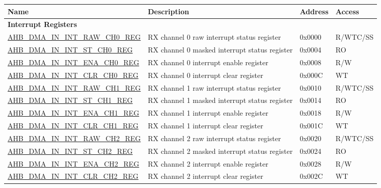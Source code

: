 \newif\ifahbdmalateststatus
\iftagged{ESP32-P4-latest}{\ahbdmalateststatustrue}{\ahbdmalateststatusfalse}
\begin{longtable}{ | l | p{10cm} | p{1.3cm} | l | }
\hline\rowcolor{lightgray}
\textbf{Name} & \textbf{Description} & \textbf{Address} & \textbf{Access} \\ \hline
\endhead
\multicolumn{4}{|l|}{\textbf{Interrupt Registers}} \\ \hline
\hyperref[regdesc:AHBDMAININTRAWCHNREG]{AHB\_DMA\_IN\_INT\_RAW\_CH0\_REG} & RX channel 0 raw interrupt status register & 0x0000 & R/WTC/SS \\ \hline
\hyperref[regdesc:AHBDMAININTSTCHNREG]{AHB\_DMA\_IN\_INT\_ST\_CH0\_REG} & RX channel 0 masked interrupt status register & 0x0004 & RO \\ \hline
\hyperref[regdesc:AHBDMAININTENACHNREG]{AHB\_DMA\_IN\_INT\_ENA\_CH0\_REG} & RX channel 0 interrupt enable register & 0x0008 & R/W \\ \hline
\hyperref[regdesc:AHBDMAININTCLRCHNREG]{AHB\_DMA\_IN\_INT\_CLR\_CH0\_REG} & RX channel 0 interrupt clear register & 0x000C & WT \\ \hline
\hyperref[regdesc:AHBDMAININTRAWCHNREG]{AHB\_DMA\_IN\_INT\_RAW\_CH1\_REG} & RX channel 1 raw interrupt status register & 0x0010 & R/WTC/SS \\ \hline
\hyperref[regdesc:AHBDMAININTSTCHNREG]{AHB\_DMA\_IN\_INT\_ST\_CH1\_REG} & RX channel 1 masked interrupt status register & 0x0014 & RO \\ \hline
\hyperref[regdesc:AHBDMAININTENACHNREG]{AHB\_DMA\_IN\_INT\_ENA\_CH1\_REG} & RX channel 1 interrupt enable register & 0x0018 & R/W \\ \hline
\hyperref[regdesc:AHBDMAININTCLRCHNREG]{AHB\_DMA\_IN\_INT\_CLR\_CH1\_REG} & RX channel 1 interrupt clear register & 0x001C & WT \\ \hline
\hyperref[regdesc:AHBDMAININTRAWCHNREG]{AHB\_DMA\_IN\_INT\_RAW\_CH2\_REG} & RX channel 2 raw interrupt status register & 0x0020 & R/WTC/SS \\ \hline
\hyperref[regdesc:AHBDMAININTSTCHNREG]{AHB\_DMA\_IN\_INT\_ST\_CH2\_REG} & RX channel 2 masked interrupt status register & 0x0024 & RO \\ \hline
\hyperref[regdesc:AHBDMAININTENACHNREG]{AHB\_DMA\_IN\_INT\_ENA\_CH2\_REG} & RX channel 2 interrupt enable register & 0x0028 & R/W \\ \hline
\hyperref[regdesc:AHBDMAININTCLRCHNREG]{AHB\_DMA\_IN\_INT\_CLR\_CH2\_REG} & RX channel 2 interrupt clear register & 0x002C & WT \\ \hline

\end{longtable}
